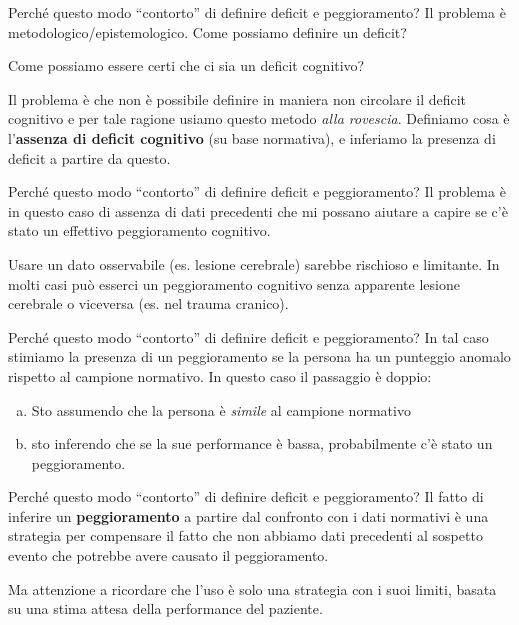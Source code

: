 \documentclass[
  ignorenonframetext,
  aspectratio=169,
]{beamer}
\begin{document}
\begin{frame}{Perché questo modo ``contorto'' di definire deficit e
peggioramento?}
\label{perchuxe9-questo-modo-contorto-di-definire-deficit-e-peggioramento-1}
Il problema è metodologico/epistemologico. Come possiamo definire un
deficit?

Come possiamo essere certi che ci sia un deficit cognitivo?

Il problema è che non è possibile definire in maniera non circolare il
deficit cognitivo e per tale ragione usiamo questo metodo \emph{alla
rovescia}. Definiamo cosa è l'\textbf{assenza di deficit cognitivo} (su
base normativa), e inferiamo la presenza di deficit a partire da questo.
\end{frame}

\begin{frame}{Perché questo modo ``contorto'' di definire deficit e
peggioramento?}
\label{perchuxe9-questo-modo-contorto-di-definire-deficit-e-peggioramento-2}
Il problema è in questo caso di assenza di dati precedenti che mi
possano aiutare a capire se c'è stato un effettivo peggioramento
cognitivo.

Usare un dato osservabile (es. lesione cerebrale) sarebbe rischioso e
limitante. In molti casi può esserci un peggioramento cognitivo senza
apparente lesione cerebrale o viceversa (es. nel trauma cranico).
\end{frame}

\begin{frame}{Perché questo modo ``contorto'' di definire deficit e
peggioramento?}
\label{perchuxe9-questo-modo-contorto-di-definire-deficit-e-peggioramento-3}
In tal caso stimiamo la presenza di un peggioramento se la persona ha un
punteggio anomalo rispetto al campione normativo. In questo caso il
passaggio è doppio:

\begin{enumerate}
[a)]
\item
  Sto assumendo che la persona è \emph{simile} al campione normativo
\item
  sto inferendo che se la sue performance è bassa, probabilmente c'è
  stato un peggioramento.
\end{enumerate}
\end{frame}

\begin{frame}{Perché questo modo ``contorto'' di definire deficit e
peggioramento?}
\label{perchuxe9-questo-modo-contorto-di-definire-deficit-e-peggioramento-4}
Il fatto di inferire un \textbf{peggioramento} a partire dal confronto
con i dati normativi è una strategia per compensare il fatto che non
abbiamo dati precedenti al sospetto evento che potrebbe avere causato il
peggioramento.

Ma attenzione a ricordare che l'uso è solo una strategia con i suoi
limiti, basata su una stima attesa della performance del paziente.
\end{frame}
\end{document}
